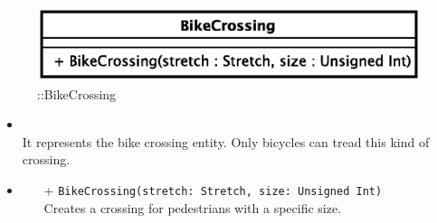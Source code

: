\begin{figure}[h]
\centering
\includegraphics[scale=0.6,keepaspectratio]{images/solution/app/backend/bike_crossing.eps}
\caption{\pReactiveComponentStretchDecoration::BikeCrossing}
\label{fig:sd-app-bike_crossing}
\end{figure}
\FloatBarrier
\begin{itemize}
  \item \textbf{\descr} \\
    It represents the bike crossing entity. Only bicycles can tread this kind 
of crossing.
\item \textbf{\ops}
  \begin{itemize}
    \item[+] \texttt{BikeCrossing(stretch: Stretch, size: Unsigned Int)} \\
Creates a crossing for pedestrians with a specific size.
  	\end{itemize}
\end{itemize}
